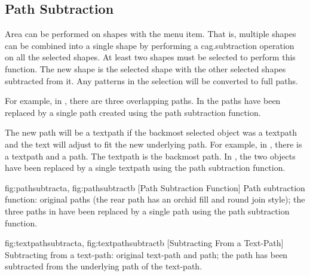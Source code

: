 
\subsection{Path Subtraction}\label{sec:pathsubtract}


Area  can be performed on \glspl{shape} with
the  menu item. That is, multiple \glspl{shape}
can be combined into a single \gls*{shape} by performing a
\gls{cag.subtraction} operation on all the selected \glspl*{shape}.  At
least two \glspl*{shape} must be selected to perform this function.
The new shape is the  selected shape with
the other selected shapes subtracted from it. Any \glspl{pattern} in
the selection will be converted to full paths.

For example, in
, there are three overlapping
paths.  In  the paths have been
replaced by a single path created using the path subtraction
function.

The new path will be a \gls*{textpath} if the backmost selected
object was a \gls*{textpath} and the text will adjust to fit the
new underlying path. For example, in
, there is a \gls*{textpath}
and a \gls*{path}. The \gls*{textpath} is the backmost path.
In , the two objects have
been replaced by a single \gls*{textpath} using the path subtraction
function.

{
  {fig:pathsubtracta}{}{},
  {fig:pathsubtractb}{}{}
}
[Path Subtraction Function]
{Path subtraction function:
 original paths (the rear path 
has an orchid fill  and round join style);
 the three paths 
in  have
been replaced by a single path using the path subtraction function.}

{
  {fig:textpathsubtracta}{}{},
  {fig:textpathsubtractb}{}{}
}
[Subtracting From a Text-Path]
{Subtracting from a text-path: 
 original text-path and path; 
 the path has been 
subtracted from the underlying path of the text-path.}

